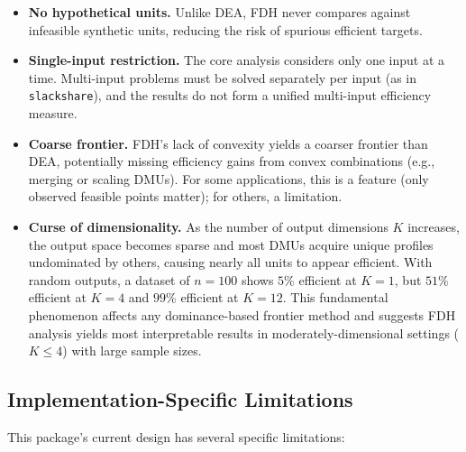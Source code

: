 \documentclass[11pt]{article}
\theoremstyle{definition}
\theoremstyle{plain}
\theoremstyle{remark}
\begin{document}
\begin{itemize}
\item \textbf{No hypothetical units.} Unlike DEA, FDH never compares against infeasible synthetic units,
  reducing the risk of spurious efficient targets.

\item \textbf{Single-input restriction.} The core analysis considers only one input at a time.
  Multi-input problems must be solved separately per input (as in \texttt{slackshare}),
  and the results do not form a unified multi-input efficiency measure.

\item \textbf{Coarse frontier.} FDH's lack of convexity yields a coarser frontier than DEA,
  potentially missing efficiency gains from convex combinations (e.g., merging or scaling DMUs).
  For some applications, this is a feature (only observed feasible points matter); for others, a limitation.

\item \textbf{Curse of dimensionality.} As the number of output dimensions $K$ increases, the output space becomes sparse
  and most DMUs acquire unique profiles undominated by others, causing nearly all units to appear efficient.
  With random outputs, a dataset of $n=100$ shows $5\%$ efficient at $K=1$, but $51\%$ efficient at $K=4$ and $99\%$ efficient at $K=12$.
  This fundamental phenomenon affects any dominance-based frontier method and suggests FDH analysis yields most interpretable results
  in moderately-dimensional settings ($K \le 4$) with large sample sizes.
\end{itemize}

\subsection*{Implementation-Specific Limitations}

This package's current design has several specific limitations:
\end{document}
